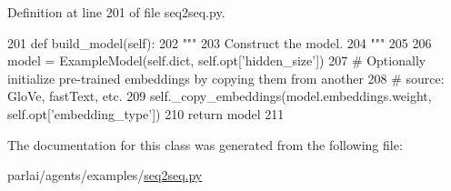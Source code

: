 Definition at line 201 of file seq2seq.\+py.


\begin{DoxyCode}
201     \textcolor{keyword}{def }build\_model(self):
202         \textcolor{stringliteral}{"""}
203 \textcolor{stringliteral}{        Construct the model.}
204 \textcolor{stringliteral}{        """}
205 
206         model = ExampleModel(self.dict, self.opt[\textcolor{stringliteral}{'hidden\_size'}])
207         \textcolor{comment}{# Optionally initialize pre-trained embeddings by copying them from another}
208         \textcolor{comment}{# source: GloVe, fastText, etc.}
209         self.\_copy\_embeddings(model.embeddings.weight, self.opt[\textcolor{stringliteral}{'embedding\_type'}])
210         \textcolor{keywordflow}{return} model
211 \end{DoxyCode}


The documentation for this class was generated from the following file\+:\begin{DoxyCompactItemize}
\item 
parlai/agents/examples/\hyperlink{agents_2examples_2seq2seq_8py}{seq2seq.\+py}\end{DoxyCompactItemize}
